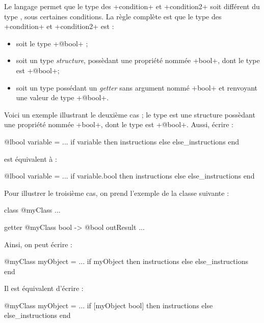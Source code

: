 
Le langage permet que le type des \ggs+condition+ et \ggs+condition2+ soit différent du type , sous certaines conditions. La règle complète est que le type des \ggs+condition+ et \ggs+condition2+ est :
\begin{itemize}
\item soit le type \ggs+@bool+ ;
\item soit un type \emph{structure}, possèdant une propriété nommée \ggs+bool+, dont le type est \ggs+@bool+; 
\item soit un type possédant un \emph{getter} sans argument nommé \ggs+bool+ et renvoyant une valeur de type \ggs+@bool+.
\end{itemize}

Voici un exemple illustrant le deuxième cas ; le type  est une structure possèdant une propriété nommée \ggs+bool+, dont le type est \ggs+@bool+. Aussi, écrire :

\begin{galgas}
@lbool variable = ...
if variable then
  instructions
else
  else_instructions
end
\end{galgas}


est équivalent à :
\begin{galgas}
@lbool variable = ...
if variable.bool then
  instructions
else
  else_instructions
end
\end{galgas}


Pour illustrer le troisième cas, on prend l'exemple de la classe suivante :
\begin{galgas}
class @myClass { ... }

getter @myClass bool -> @bool outResult { ... }
\end{galgas}

Ainsi, on peut écrire :
\begin{galgas}
@myClass myObject = ...
if myObject then
  instructions
else
  else_instructions
end
\end{galgas}


Il est équivalent d'écrire :
\begin{galgas}
@myClass myObject = ...
if [myObject bool] then
  instructions
else
  else_instructions
end
\end{galgas}



